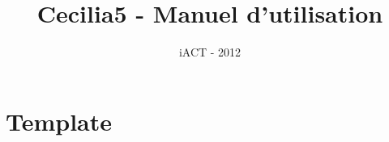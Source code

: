 \documentclass[11pt,francais]{book}
\begin{document}
\title{Cecilia5 - Manuel d'utilisation}
\author{iACT - 2012}
\maketitle
\tableofcontents

\chapter{Template}

\end{document}
